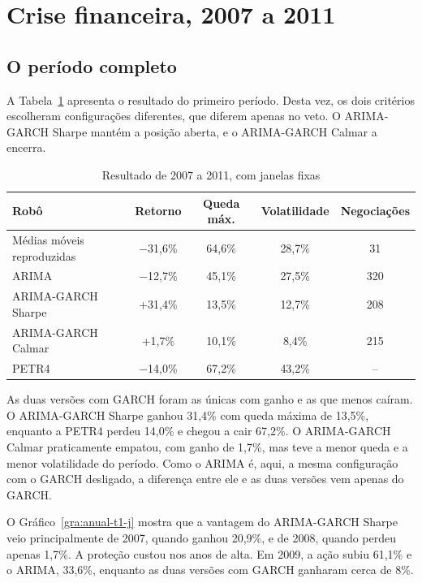 \section{Crise financeira, 2007 a 2011}

\subsection{O período completo}

A Tabela~\ref{tab:crise-j} apresenta o resultado do primeiro período. Desta vez,
os dois critérios escolheram configurações diferentes, que diferem apenas no veto.
O ARIMA-GARCH Sharpe mantém a posição aberta, e o ARIMA-GARCH Calmar a encerra.

\begin{table}[htbp]
\centering
\caption{Resultado de 2007 a 2011, com janelas fixas}
\label{tab:crise-j}
\fontsize{10}{12}\selectfont
\begin{tabular}{l|c|c|c|c}
\hline
Robô & Retorno & Queda máx. & Volatilidade & Negociações \\
\hline
Médias móveis reproduzidas & $-$31,6\% & 64,6\% & 28,7\% & 31 \\
\hline
ARIMA & $-$12,7\% & 45,1\% & 27,5\% & 320 \\
\hline
ARIMA-GARCH Sharpe & +31,4\% & 13,5\% & 12,7\% & 208 \\
\hline
ARIMA-GARCH Calmar & +1,7\% & 10,1\% & 8,4\% & 215 \\
\hline
PETR4 & $-$14,0\% & 67,2\% & 43,2\% & -- \\
\hline
\end{tabular}
\end{table}

As duas versões com GARCH foram as únicas com ganho e as que menos caíram. O
ARIMA-GARCH Sharpe ganhou 31,4\% com queda máxima de 13,5\%, enquanto a PETR4
perdeu 14,0\% e chegou a cair 67,2\%. O ARIMA-GARCH Calmar praticamente empatou,
com ganho de 1,7\%, mas teve a menor queda e a menor volatilidade do período.
Como o ARIMA é, aqui, a mesma configuração com o GARCH desligado, a diferença
entre ele e as duas versões vem apenas do GARCH.

O Gráfico~\ref{gra:anual-t1-j} mostra que a vantagem do ARIMA-GARCH Sharpe veio
principalmente de 2007, quando ganhou 20,9\%, e de 2008, quando perdeu apenas
1,7\%. A proteção custou nos anos de alta. Em 2009, a ação subiu 61,1\% e o
ARIMA, 33,6\%, enquanto as duas versões com GARCH ganharam cerca de 8\%.

